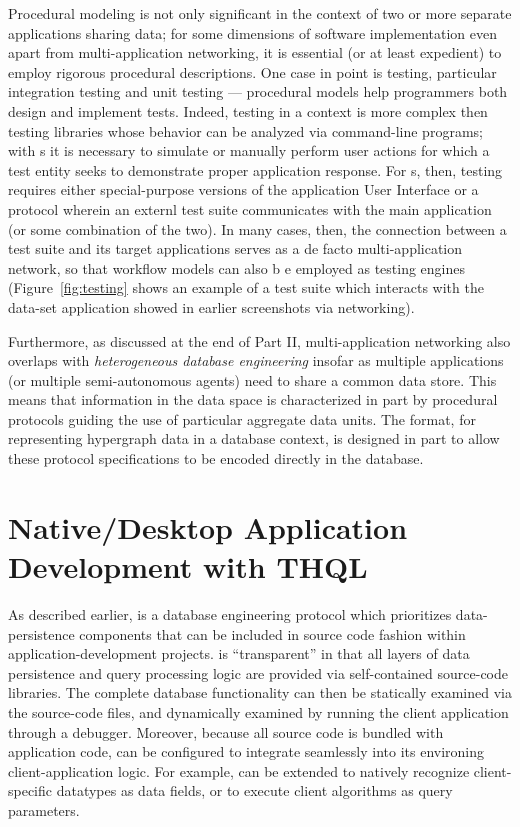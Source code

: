 \documentclass[11pt,letterpaper]{article}
\newcommand{\ATextCClr}[1]{\textcolor{atcColor}{\textbf{#1}}}
\newcommand{\THQL}{\resizebox{!}{7.5pt}{\ATextCClr{THQL}}}
\newcommand{\lTHQL}{\resizebox{!}{8pt}{\ATextCClr{THQL}}}
\newcommand{\GUI}{\resizebox{!}{7pt}{\AcronymText{GUI}}}
\newcommand{\textscc}[1]{{\color{orr!35!black}{{%
						\fontfamily{Cabin-TLF}\fontseries{b}\selectfont{\textsc{\scriptsize{#1}}}}}}}
\newcommand{\AcronymText}[1]{{\textscc{#1}}}
\newcommand{\TCP}{\resizebox{!}{7pt}{\AcronymText{TCP}}}
\newcommand{\p}[1]{

\vspace{1em}#1}
\newcommand{\q}[1]{{\fontfamily{qcr}\selectfont ``}#1{\fontfamily{qcr}\selectfont ''}}
\begin{document}
{\p{Procedural modeling is not only significant 
in the context of two or more separate applications 
sharing data; for some dimensions of software 
implementation even apart from multi-application 
networking, it is essential (or at least expedient) 
to employ rigorous procedural descriptions.  
One case in point is testing, particular 
integration testing and \GUI{} unit testing 
--- procedural models help programmers 
both design and implement tests.  
Indeed, testing in a \GUI{} context is 
more complex then testing libraries 
whose behavior can be analyzed via 
command-line programs; with \GUI{}s 
it is necessary to simulate or manually 
perform user actions for which a 
test entity seeks to demonstrate proper 
application response.  For \GUI{}s, then, 
testing requires either special-purpose 
versions of the application User Interface 
or a protocol wherein an externl test suite 
communicates with the main application 
(or some combination of the two).  In many 
cases, then, the connection between a 
test suite and its target applications 
serves as a de facto multi-application network, 
so that workflow models can also b e employed 
as testing engines (Figure~\ref{fig:testing} 
shows an example of a test suite which 
interacts with the data-set application showed 
in earlier screenshots via \TCP{} networking).}

 
\p{Furthermore, as discussed at the end of Part II, 
multi-application networking also overlaps 
with \textit{heterogeneous database engineering} 
insofar as multiple applications 
(or multiple semi-autonomous agents) need 
to share a common data store.  This 
means that information in the data space 
is characterized in part by procedural protocols 
guiding the use of particular aggregate data 
units.  The \THQL{} format, for 
representing hypergraph data in a database 
context, is designed in part to allow 
these protocol specifications to be 
encoded directly in the database.}

\section{Native/Desktop Application Development with THQL}
\p{As described earlier, \THQL{} is a database 
engineering protocol which prioritizes 
data-persistence components that can be 
included in source code fashion within application-development 
projects.  \lTHQL{} is \q{transparent} in that 
all layers of data persistence and 
query processing logic are provided 
via self-contained source-code libraries.  
The complete database functionality can 
then be statically examined via the source-code 
files, and dynamically examined by running the 
client application through a debugger.  Moreover, 
because all \THQL{} source code is bundled with 
application code, \THQL{} can be configured to 
integrate seamlessly into its environing client-application  
logic.  For example, \THQL{} can be 
extended to natively recognize client-specific 
datatypes as data fields, or to execute 
client algorithms as query parameters.}

}
\end{document}
